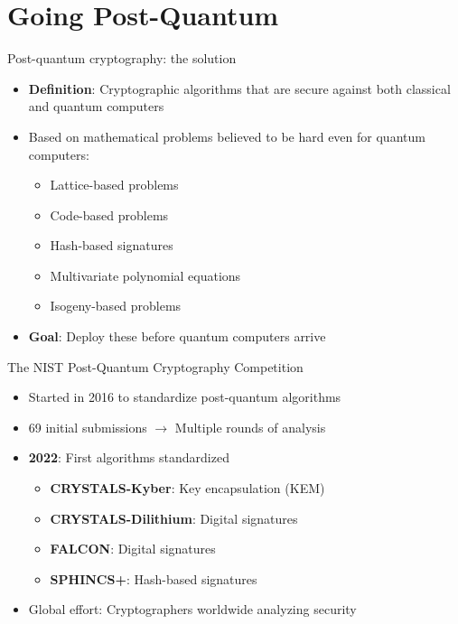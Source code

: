 \documentclass[aspectratio=169, lualatex, handout]{beamer}
\begin{document}
\section{Going Post-Quantum}

\begin{frame}{Post-quantum cryptography: the solution}
	\begin{itemize}
		\item \textbf{Definition}: Cryptographic algorithms that are secure against both classical and quantum computers
		\item Based on mathematical problems believed to be hard even for quantum computers:
		      \begin{itemize}
			      \item Lattice-based problems
			      \item Code-based problems
			      \item Hash-based signatures
			      \item Multivariate polynomial equations
			      \item Isogeny-based problems
		      \end{itemize}
		\item \textbf{Goal}: Deploy these before quantum computers arrive
	\end{itemize}
\end{frame}

\begin{frame}{The NIST Post-Quantum Cryptography Competition}
	\begin{itemize}
		\item Started in 2016 to standardize post-quantum algorithms
		\item 69 initial submissions $\rightarrow$ Multiple rounds of analysis
		\item \textbf{2022}: First algorithms standardized
		      \begin{itemize}
			      \item \textbf{CRYSTALS-Kyber}: Key encapsulation (KEM)
			      \item \textbf{CRYSTALS-Dilithium}: Digital signatures
			      \item \textbf{FALCON}: Digital signatures
			      \item \textbf{SPHINCS+}: Hash-based signatures
		      \end{itemize}
		\item Global effort: Cryptographers worldwide analyzing security
	\end{itemize}
\end{frame}
\end{document}
